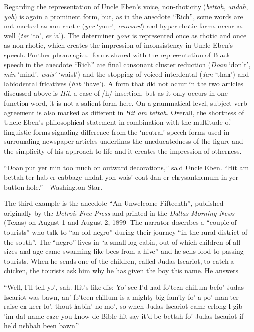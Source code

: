 Regarding the representation of Uncle Eben’s voice, non-rhoticity (\emph{bettah}, \emph{undah}, \emph{yoh}) is again a prominent form, but, as in the anecdote “Rich”, some words are not marked as non-rhotic (\emph{yer} ‘your’, \emph{outward}) and hyper-rhotic forms occur as well (\emph{ter} ‘to’, \emph{er} ‘a’). The determiner \emph{your} is represented once as rhotic and once as non-rhotic, which creates the impression of inconsistency in Uncle Eben’s speech. Further phonological forms shared with the representation of Black speech in the anecdote “Rich” are final consonant cluster reduction (\emph{Doan} ‘don’t’, \emph{min} ‘mind’, \emph{wais’} ‘waist’) and the stopping of voiced interdental (\emph{dan} ‘than’) and labiodental fricatives (\emph{hab} ‘have’). A form that did not occur in the two articles discussed above is \emph{Hit}, a case of /h/-insertion, but as it only occurs in one function word, it is not a salient form here. On a grammatical level, subject-verb agreement is also marked as different in \emph{Hit am bettah}. Overall, the shortness of Uncle Eben’s philosophical statement in combination with the multitude of linguistic forms signaling difference from the ‘neutral’ speech forms used in surrounding newspaper articles underlines the uneducatedness of the figure and the simplicity of his approach to life and it creates the impression of otherness.

\begin{ipquote}
\begin{center}
\end{center}
“Doan put yer min too much on outward decorations,” said Uncle Eben. “Hit am bettah ter hab er cabbage undah yoh wais’-coat dan er chrysanthemum in yer button-hole.”—Washington Star.
\end{ipquote}

The third example is the anecdote “An Unwelcome Fifteenth”, published originally by the \emph{Detroit Free Press} and printed in the \emph{Dallas Morning News} (Texas) on August 1 and August 2, 1899. The narrator describes a “couple of tourists” who talk to “an old negro” during their journey “in the rural district of the south”. The “negro” lives in “a small log cabin, out of which children of all sizes and age came swarming like bees from a hive” and he sells food to passing tourists. When he sends one of the children, called Judas Iscariot, to catch a chicken, the tourists ask him why he has given the boy this name. He answers

\begin{ipquote}
“Well, I’ll tell yo’, sah. Hit’s like dis: Yo’ see I’d had fo’teen chillum befo’ Judas Iscariot was bawn, an’ fo’teen chillum is a mighty big fam’ly fo’ a po’ man ter raise en keer fo’, thout habin’ no mo’, so when Judas Iscariot came erlong I gib ’im dat name caze you know de Bible hit say it’d be bettah fo’ Judas Iscariot if he’d nebbah been bawn.”
\end{ipquote}


